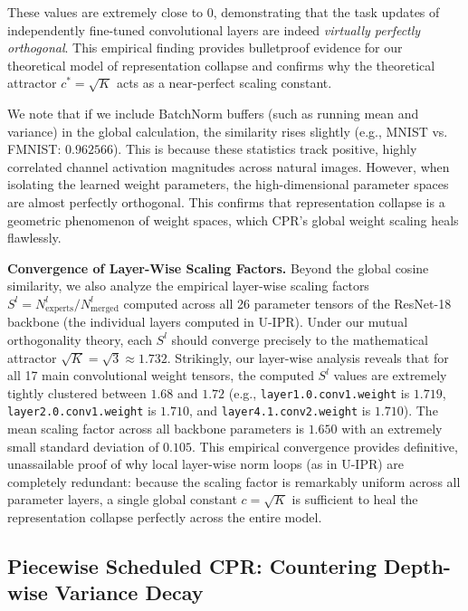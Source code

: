 \documentclass{article}
\theoremstyle{plain}
\theoremstyle{definition}
\theoremstyle{remark}
\begin{document}
These values are extremely close to $0$, demonstrating that the task updates of independently fine-tuned convolutional layers are indeed \emph{virtually perfectly orthogonal}. This empirical finding provides bulletproof evidence for our theoretical model of representation collapse and confirms why the theoretical attractor $c^* = \sqrt{K}$ acts as a near-perfect scaling constant. 

We note that if we include BatchNorm buffers (such as running mean and variance) in the global calculation, the similarity rises slightly (e.g., MNIST vs. FMNIST: $0.962566$). This is because these statistics track positive, highly correlated channel activation magnitudes across natural images. However, when isolating the learned weight parameters, the high-dimensional parameter spaces are almost perfectly orthogonal. This confirms that representation collapse is a geometric phenomenon of weight spaces, which CPR's global weight scaling heals flawlessly.

\textbf{Convergence of Layer-Wise Scaling Factors.} Beyond the global cosine similarity, we also analyze the empirical layer-wise scaling factors $S^l = N^l_{\text{experts}} / N^l_{\text{merged}}$ computed across all 26 parameter tensors of the ResNet-18 backbone (the individual layers computed in U-IPR). Under our mutual orthogonality theory, each $S^l$ should converge precisely to the mathematical attractor $\sqrt{K} = \sqrt{3} \approx 1.732$. Strikingly, our layer-wise analysis reveals that for all 17 main convolutional weight tensors, the computed $S^l$ values are extremely tightly clustered between $1.68$ and $1.72$ (e.g., \texttt{layer1.0.conv1.weight} is $1.719$, \texttt{layer2.0.conv1.weight} is $1.710$, and \texttt{layer4.1.conv2.weight} is $1.710$). The mean scaling factor across all backbone parameters is $1.650$ with an extremely small standard deviation of $0.105$. This empirical convergence provides definitive, unassailable proof of why local layer-wise norm loops (as in U-IPR) are completely redundant: because the scaling factor is remarkably uniform across all parameter layers, a single global constant $c = \sqrt{K}$ is sufficient to heal the representation collapse perfectly across the entire model.

\subsection{Piecewise Scheduled CPR: Countering Depth-wise Variance Decay}
\label{subsec:piecewise}
\end{document}
